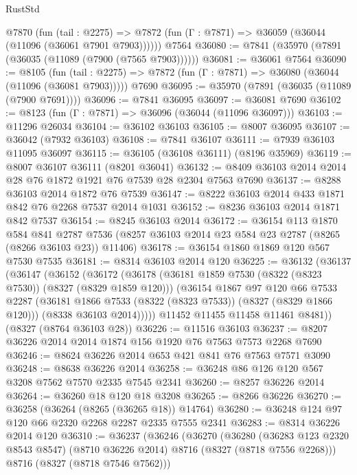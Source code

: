 \begin{lexlean}{RustStd}
\begin{coremodule}
    @7870
      (fun (tail : @2275) =>
      @7872 (fun (Γ : @7871) => @36059 (@36044 (@11096 (@36061 @7901 @7903))))))
    @7564
@36080 := @7841 (@35970 (@7891 (@36035 (@11089 (@7900 (@7565 @7903))))))
@36081 := @36061 @7564
@36090 := @8105
    (fun (tail : @2275) => @7872 (fun (Γ : @7871) => @36080 (@36044 (@11096 (@36081 @7903)))))
    @7690
@36095 := @35970 (@7891 (@36035 (@11089 (@7900 @7691))))
@36096 := @7841 @36095
@36097 := @36081 @7690
@36102 := @8123 (fun (Γ : @7871) => @36096 (@36044 (@11096 @36097)))
@36103 := @11296 @26034
@36104 := @36102 @36103
@36105 := @8007 @36095
@36107 := @36042 (@7932 @36103)
@36108 := @7841 @36107
@36111 := @7939 @36103 @11095 @36097
@36115 := @36105 (@36108 @36111) (@8196 @35969)
@36119 := @8007 @36107 @36111 (@8201 @36041)
@36132 := @8409 @36103 @2014 @2014 @28 @76 @1872 @1921 @76 @7539 @28 @2304 @7563 @7690
@36137 := @8288 @36103 @2014 @1872 @76 @7539
@36147 := @8222 @36103 @2014 @433 @1871 @842 @76 @2268 @7537 @2014 @1031
@36152 := @8236 @36103 @2014 @1871 @842 @7537
@36154 := @8245 @36103 @2014
@36172 := @36154
    @113
    @1870
    @584
    @841
    @2787
    @7536
    (@8257 @36103 @2014 @23 @584 @23 @2787 (@8265 (@8266 @36103 @23)) @11406)
@36178 := @36154 @1860 @1869 @120 @567 @7530 @7535
@36181 := @8314 @36103 @2014 @120
@36225 := @36132
    (@36137
      (@36147
        (@36152
          (@36172
            (@36178
              (@36181 @1859 @7530 (@8322 (@8323 @7530)) (@8327 (@8329 @1859 @120)))
              (@36154
                @1867
                @97
                @120
                @66
                @7533
                @2287
                (@36181 @1866 @7533 (@8322 (@8323 @7533)) (@8327 (@8329 @1866 @120)))
                (@8338 @36103 @2014)))))
        @11452
        @11455
        @11458
        @11461
        @8481))
    (@8327 (@8764 @36103 @28))
@36226 := @11516 @36103
@36237 := @8207 @36226 @2014 @2014 @1874 @156 @1920 @76 @7563 @7573 @2268 @7690
@36246 := @8624 @36226 @2014 @653 @421 @841 @76 @7563 @7571 @3090
@36248 := @8638 @36226 @2014
@36258 := @36248 @86 @126 @120 @567 @3208 @7562 @7570 @2335 @7545 @2341
@36260 := @8257 @36226 @2014
@36264 := @36260 @18 @120 @18 @3208
@36265 := @8266 @36226
@36270 := @36258 (@36264 (@8265 (@36265 @18)) @14764)
@36280 := @36248 @124 @97 @120 @66 @2320 @2268 @2287 @2335 @7555 @2341
@36283 := @8314 @36226 @2014 @120
@36310 := @36237
    (@36246
      (@36270
        (@36280
          (@36283 @123 @2320 @8543 @8547)
          (@8710 @36226 @2014)
          @8716
          (@8327 (@8718 @7556 @2268)))
        @8716
        (@8327 (@8718 @7546 @7562)))

\end{coremodule}
\end{lexlean}
